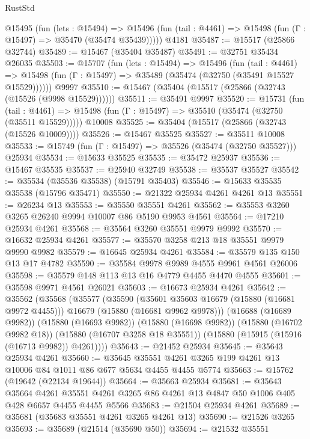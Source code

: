 \begin{lexlean}{RustStd}
\begin{coremodule}
    @15495
      (fun (lets : @15494) =>
      @15496 (fun (tail : @4461) => @15498 (fun (Γ : @15497) => @35470 (@35474 @35439)))))
    @4181
@35487 := @15517 (@25866 @32744)
@35489 := @15467 (@35404 @35487)
@35491 := @32751 @35434 @26035
@35503 := @15707
    (fun (lets : @15494) =>
    @15496
      (fun (tail : @4461) =>
      @15498 (fun (Γ : @15497) => @35489 (@35474 (@32750 (@35491 @15527 @15529))))))
    @9997
@35510 := @15467 (@35404 (@15517 (@25866 (@32743 (@15526 (@9998 @15529))))))
@35511 := @35491 @9997
@35520 := @15731
    (fun (tail : @4461) => @15498 (fun (Γ : @15497) => @35510 (@35474 (@32750 (@35511 @15529)))))
    @10008
@35525 := @35404 (@15517 (@25866 (@32743 (@15526 @10009))))
@35526 := @15467 @35525
@35527 := @35511 @10008
@35533 := @15749 (fun (Γ : @15497) => @35526 (@35474 (@32750 @35527))) @25934
@35534 := @15633 @35525
@35535 := @35472 @25937
@35536 := @15467 @35535
@35537 := @25940 @32749
@35538 := @35537 @35527
@35542 := @35534 (@35536 @35538) (@15791 @35403)
@35546 := @15633 @35535 @35538 (@15796 @35471)
@35550 := @21322 @25934 @4261 @4261 @13
@35551 := @26234 @13
@35553 := @35550 @35551 @4261
@35562 := @35553 @3260 @3265 @26240 @9994 @10007 @86 @5190 @9953 @4561
@35564 := @17210 @25934 @4261
@35568 := @35564 @3260 @35551 @9979 @9992
@35570 := @16632 @25934 @4261
@35577 := @35570 @3258 @213 @18 @35551 @9979 @9990 @9982
@35579 := @16645 @25934 @4261
@35584 := @35579 @135 @150 @13 @17 @4782
@35590 := @35584 @9978 @9989 @4555 @9961 @4561 @26006
@35598 := @35579 @148 @113 @13 @16 @4779 @4455 @4470 @4555
@35601 := @35598 @9971 @4561 @26021
@35603 := @16673 @25934 @4261
@35642 := @35562
    (@35568
      (@35577
        (@35590
          (@35601 @35603 @16679 (@15880 (@16681 @9972 @4455)))
          @16679
          (@15880 (@16681 @9962 @9978)))
        (@16688 (@16689 @9982))
        (@15880 (@16693 @9982))
        (@15880 (@16698 @9982))
        (@15880 (@16702 @9982 @18))
        (@15880 (@16707 @3258 @18 @35551))
        (@15880 (@15915 (@15916 (@16713 @9982)) @4261))))
@35643 := @21452 @25934
@35645 := @35643 @25934 @4261
@35660 := @35645 @35551 @4261 @3265 @199 @4261 @13 @10006 @84 @1011 @86 @677 @5634 @4455 @4455 @5774
@35663 := @15762 (@19642 (@22134 @19644))
@35664 := @35663 @25934
@35681 := @35643
    @35664
    @4261
    @35551
    @4261
    @3265
    @86
    @4261
    @13
    @4847
    @50
    @1006
    @405
    @428
    @6657
    @4455
    @4455
    @5566
@35683 := @21504 @25934 @4261
@35689 := @35681 (@35683 @35551 @4261 @3265 @4261 @13)
@35690 := @21526 @3265
@35693 := @35689 (@21514 (@35690 @50))
@35694 := @21532 @35551

\end{coremodule}
\end{lexlean}
